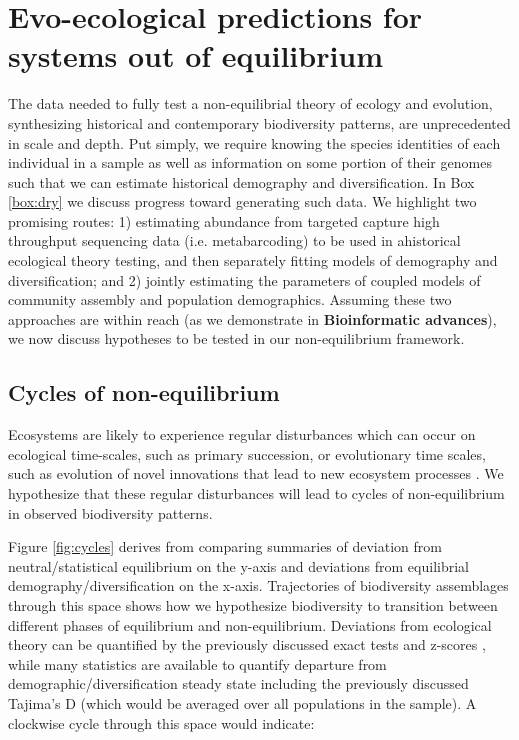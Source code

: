 \documentclass[12pt]{article}
\newcounter{Box}
\begin{document}
\section{Evo-ecological predictions for systems out of equilibrium} \label{sec:pred}

The data needed to fully test a non-equilibrial theory of ecology and
evolution, synthesizing historical and contemporary biodiversity
patterns, are unprecedented in scale and depth. Put simply, we require
knowing the species identities of each individual in a sample as well
as information on some portion of their genomes such that we can
estimate historical demography and diversification. In Box
\ref{box:dry} we discuss progress toward generating such data. We
highlight two promising routes: 1) estimating abundance from targeted
capture high throughput sequencing data (i.e.  metabarcoding) to be
used in ahistorical ecological theory testing, and then separately
fitting models of demography and diversification; and 2) jointly
estimating the parameters of coupled models of community assembly and
population demographics. Assuming these two approaches are within
reach (as we demonstrate in \textbf{Bioinformatic advances}), we now
discuss hypotheses to be tested in our non-equilibrium framework.

\subsection{Cycles of non-equilibrium}

Ecosystems are likely to experience regular disturbances which can
occur on ecological time-scales, such as primary succession, or
evolutionary time scales, such as evolution of novel innovations that
lead to new ecosystem processes \citep{redQueen, erwin2008}. We
hypothesize that these regular disturbances will lead to cycles of
non-equilibrium in observed biodiversity patterns.

Figure \ref{fig:cycles} derives from comparing summaries of deviation
from neutral/statistical equilibrium on the y-axis and deviations from
equilibrial demography/diversification on the x-axis. Trajectories of
biodiversity assemblages through this space shows how we hypothesize
biodiversity to transition between different phases of equilibrium and
non-equilibrium. Deviations from ecological theory can be quantified
by the previously discussed exact tests \citep{etienne2007} and
z-scores \citep{meteR}, while many statistics are available to
quantify departure from demographic/diversification steady state
including the previously discussed Tajima's D (which would be averaged
over all populations in the sample). A clockwise cycle through this
space would indicate:
\end{document}
